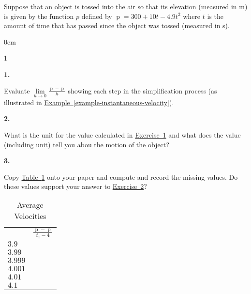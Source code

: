 \documentclass[12pt,]{book}
\theoremstyle{plain}
\theoremstyle{definition}
\numberwithin{equation}{section}
\newcommand{\hrulemedium}{\noalign{\hrule height 0.07em}}
\newcommand{\hrulethick} {\noalign{\hrule height 0.11em}}
\newenvironment{exercisegroup}%
{\medskip\noindent}%
{\par\bigskip}%
\newlength{\exercisegroupindent}%
\newlength{\exercisegroupitemwidth}%
\newenvironment{exercisegrouplist}%
{\vspace{-\partopsep}%
\begin{adjustwidth}{\exercisegroupindent}{0em}}%
{\end{adjustwidth}%
\vspace{-\partopsep}%
\vspace{\baselineskip}}%
\newenvironment{exercisegroupbycol}[1]%
{\begin{exercisegrouplist}%
\vspace{-\multicolsep}%
\begin{multicols}{#1}%
\setlength{\parindent}{0em}%
\setlength{\exercisegroupitemwidth}{\linewidth}}%
{\end{multicols}%
\vspace{-\multicolsep}%
\end{exercisegrouplist}}%
\newenvironment{exercisegroupitem}[1]%
{\begin{minipage}[t]{\exercisegroupitemwidth}
\vspace{0pt}%
{\bfseries#1}%
\rule{0pt}{\baselineskip}}{\strut%
\end{minipage}%
\hspace{\columnsep}}%
\providecommand\phantomsection{}
\newcommand{\fe}[2]{\mathop{{#1}{\left(#2\right)}}}
\begin{document}
\begin{exercisegroup}%
Suppose that an object is tossed into the air so that its elevation (measured in \si{\meter}) is given by the function \(p\) defined by \(\fe{p}{t}=300+10t-4.9t^2\) where \(t\) is the amount of time that has passed since the object was tossed (measured in \si{\second}).%
\begin{exercisegroupbycol}{1}%
\begin{exercisegroupitem}{1. }\phantomsection\hypertarget{exercise-instantaneous-velocity}{\null}
Evaluate \(\lim\limits_{h\to0}\frac{\fe{p}{4+h}-\fe{p}{4}}{h}\) showing each step in the simplification process (as illustrated in \hyperref[example-instantaneous-velocity]{Example~\ref*{example-instantaneous-velocity}}).%
\end{exercisegroupitem}%
\par%
\begin{exercisegroupitem}{2. }\phantomsection\hypertarget{exercise-instantaneous-velocity-second}{\null}
What is the unit for the value calculated in \hyperref[exercise-instantaneous-velocity]{Exercise~1} and what does the value (including unit) tell you abou the motion of the object?%
\end{exercisegroupitem}%
\par%
\begin{exercisegroupitem}{3. }\phantomsection\hypertarget{exercise-124}{\null}
Copy \hyperref[table-instantaneous-velocity]{Table~\ref*{table-instantaneous-velocity}} onto your paper and compute and record the missing values. Do these values support your answer to \hyperref[exercise-instantaneous-velocity-second]{Exercise~2}?%
\begin{table}
\centering
\caption{Average Velocities\label{table-instantaneous-velocity}}
\begin{tabular}{ll}\hrulethick
\multicolumn{1}{c}{\(t_1\)}&\multicolumn{1}{c}{\(\frac{\fe{p}{t_1}-\fe{p}{4}}{t_1-4}\)}\\\hrulemedium
\(3.9\)&\\
\(3.99\)&\\
\(3.999\)&\\
\(4.001\)&\\
\(4.01\)&\\
\(4.1\)&
\end{tabular}
\end{table}
\end{exercisegroupitem}%
\par%
\end{exercisegroupbycol}%
\end{exercisegroup}%
\typeout{************************************************}
\typeout{************************************************}
\end{document}
